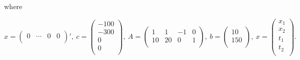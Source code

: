 where

$$

x = \left(
  \begin{array}{cccc}
    0 & \cdots & 0 & 0 \\
  \end{array}
\right)',~
c = 
\left(
  \begin{array}{c}
    -100 \\
    -300 \\
    0 \\
    0 \\
  \end{array}
\right),~
A = 
\left(
  \begin{array}{cccc}
    1 & 1 & -1 & 0 \\
    10 & 20 & 0 & 1 \\
  \end{array}
\right),~
b =
\left(
  \begin{array}{c}
    10 \\
    150 \\
  \end{array}
\right),~
x =
\left(
  \begin{array}{c}
    x_1 \\
    x_2 \\
    t_1 \\
    t_2 \\
  \end{array}
\right).
$$